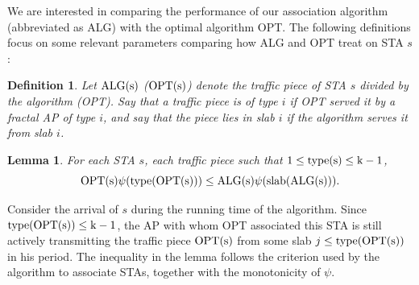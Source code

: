 \documentclass[conference]{IEEEtran}
\newtheorem{definition}{Definition}
\newtheorem{lemma}{Lemma}
\def \OPT {\rm{OPT}}
\def \ALG {\rm{ALG}}
\def \slab {\rm{slab}}
\def \type {\rm{type}}
\begin{document}
  We are interested in comparing the performance of our association algorithm (abbreviated as ALG) with the optimal algorithm OPT.  The following definitions focus on some relevant parameters comparing how ALG and OPT treat on STA $s$:
  \begin{definition}
    Let $\ALG(s)$ ($\OPT(s)$) denote the traffic piece of STA $s$ divided by the algorithm (OPT).  Say that a traffic piece is of type $i$ if OPT served it by a fractal AP of type $i$, and say that the piece lies in slab $i$ if the algorithm serves it from slab $i$.
  \end{definition}
  \begin{lemma}\label{lemma:6}
    For each STA $s$, each traffic piece such that $1\leq\type(s)\leq k-1$,
    \begin{equation*}
    \OPT(s)\psi(\type(\OPT(s)))\leq \ALG(s)\psi(\slab(\ALG(s))).
    \end{equation*}
  \end{lemma}
  \begin{IEEEproof}
    Consider the arrival of $s$ during the running time of the algorithm.  Since $\type(\OPT(s))\leq k-1$, the AP with whom OPT associated this STA is still actively transmitting the traffic piece $\OPT(s)$ from some slab $j\leq \type(\OPT(s))$ in his period.  The inequality in the lemma follows the criterion used by the algorithm to associate STAs, together with the monotonicity of $\psi$.
  \end{IEEEproof}
\end{document}
